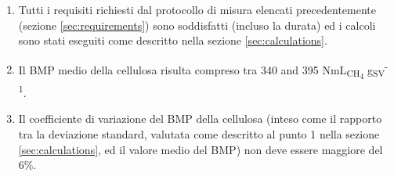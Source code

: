 \documentclass[]{article}
\begin{document}
\begin{enumerate}
  \item Tutti i requisiti richiesti dal protocollo di misura elencati precedentemente (sezione \ref{sec:requirements}) sono soddisfatti (incluso la durata) ed i calcoli sono stati eseguiti come descritto nella sezione \ref{sec:calculations}.
  \item Il BMP medio della cellulosa risulta compreso tra 340 and 395 NmL\textsubscript{CH\textsubscript{4}} g\textsubscript{SV}\textsuperscript{-1}.
  \item Il coefficiente di variazione del BMP della cellulosa (inteso come il rapporto tra la deviazione standard, valutata come descritto al punto 1 nella sezione \ref{sec:calculations}, ed il valore medio del BMP) non deve essere maggiore del 6\%.
\end{enumerate}


\end{document}

